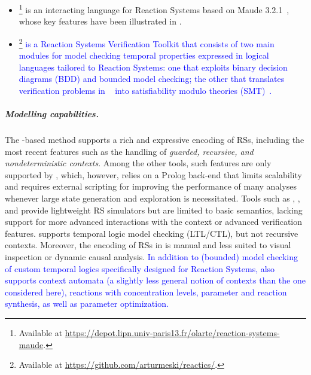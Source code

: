 \begin{itemize}
\item
\ccReact\footnote{Available at \url{https://depot.lipn.univ-paris13.fr/olarte/reaction-systems-maude}.} is an interacting language for Reaction Systems based on Maude 3.2.1~\cite{DBLP:conf/cmsb/BallisBFO24}, whose key features have been illustrated in .
\item
\textcolor{blue}{
\ReactICS\footnote{Available at \url{https://github.com/arturmeski/reactics/}.} is a Reaction Systems Verification Toolkit that consists of two main modules for model checking temporal properties expressed in logical languages tailored to Reaction Systems:
one that exploits binary decision diagrams (BDD) and bounded model checking;
the other that translates verification problems in \rsLTL~\cite{DBLP:journals/isci/MeskiPR15}  into satisfiability modulo theories (SMT)~\cite{DBLP:journals/nc/MeskiKMP24}.
}
\end{itemize}

\subparagraph*{Modelling capabilities.}
The \GROOVE-based method supports a rich and expressive encoding of RSs, including the most recent features such as the handling of \emph{guarded, recursive, and nondeterministic contexts}.
Among the other tools, such features are only supported by \BioResolve, which, however, relies on a Prolog back-end that limits scalability and requires external scripting for improving the performance of many analyses whenever large state generation and exploration is necessitated. Tools such as \HERESY, \WebRSim, and \clrs provide lightweight RS simulators but are limited to basic semantics, lacking support for more advanced interactions with the context or advanced verification features. \ccReact supports temporal logic model checking (LTL/CTL), but not recursive contexts. Moreover, the encoding of RSs in \ccReact is manual and less suited to visual inspection or dynamic causal analysis.
\textcolor{blue}{
In addition to (bounded) model checking of custom temporal logics specifically designed for Reaction Systems, \ReactICS also supports context automata (a slightly less general notion of contexts than the one considered here), reactions with concentration levels, parameter and reaction synthesis, as well as parameter optimization. 
} 

